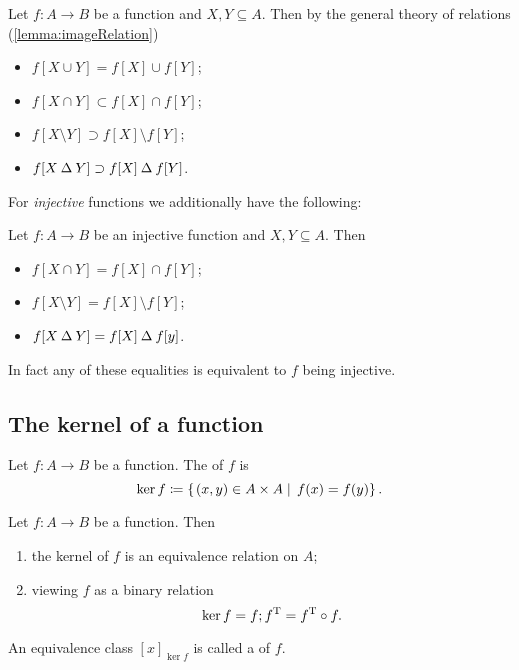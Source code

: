 Let $f:A\to B$ be a function and $X,Y\subseteq A$. Then by the general theory of relations (\ref{lemma:imageRelation})
\begin{itemize}
\item $f[X\cup Y] = f[X]\cup f[Y]$;
\item $f[X\cap Y] \subset f[X]\cap f[Y]$;
\item $f[X\setminus Y] \supset f[X]\setminus f[Y]$;
\item $f[X\mathbin{\Delta} Y] \supset f[X]\mathbin{\Delta} f[Y]$.
\end{itemize}
For \emph{injective} functions we additionally have the following:
\begin{lemma}
Let $f:A\to B$ be an injective function and $X,Y\subseteq A$. Then
\begin{itemize}
\item $f[X\cap Y] = f[X]\cap f[Y]$;
\item $f[X\setminus Y] = f[X]\setminus f[Y]$;
\item $f[X\mathbin{\Delta} Y] = f[X]\mathbin{\Delta} f[y]$.
\end{itemize}
In fact any of these equalities is equivalent to $f$ being injective.
\end{lemma}

\subsection{The kernel of a function}
\begin{definition}
Let $f:A\to B$ be a function. The  of $f$ is
\[ \ker f \coloneqq \left\{\left. (x,y)\in A\times A \;\right|\; f(x) = f(y) \right\}. \]
\end{definition}

\begin{lemma}
Let $f:A\to B$ be a function. Then
\begin{enumerate}
\item the kernel of $f$ is an equivalence relation on $A$;
\item viewing $f$ as a binary relation
\[ \ker f = f;f^{\mathrm{T}} = f^{\mathrm{T}}\circ f. \]
\end{enumerate}
\end{lemma}

\begin{definition}
An equivalence class $[x]_{\ker f}$ is called a  of $f$.
\end{definition}

